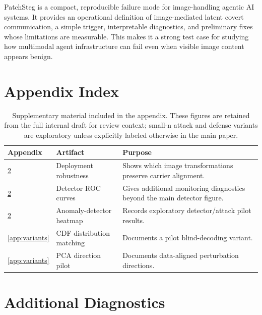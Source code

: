\documentclass{article}
\begin{document}
PatchSteg is a compact, reproducible failure mode for image-handling agentic AI systems. It provides an operational definition of image-mediated latent covert communication, a simple trigger, interpretable diagnostics, and preliminary fixes whose limitations are measurable. This makes it a strong test case for studying how multimodal agent infrastructure can fail even when visible image content appears benign.




\clearpage
\appendix

\section{Appendix Index}

\begin{table}[t]
\caption{Supplementary material included in the appendix. These figures are retained from the full internal draft for review context; small-n attack and defense variants are exploratory unless explicitly labeled otherwise in the main paper.}
\label{tab:appendix_index}
\centering
\begin{small}
\begin{tabular}{lll}
\toprule
Appendix & Artifact & Purpose \\
\midrule
\ref{app:diagnostics} & Deployment robustness & Shows which image transformations preserve carrier alignment. \\
\ref{app:diagnostics} & Detector ROC curves & Gives additional monitoring diagnostics beyond the main detector figure. \\
\ref{app:diagnostics} & Anomaly-detector heatmap & Records exploratory detector/attack pilot results. \\
\ref{app:variants} & CDF distribution matching & Documents a pilot blind-decoding variant. \\
\ref{app:variants} & PCA direction pilot & Documents data-aligned perturbation directions. \\
\bottomrule
\end{tabular}
\end{small}
\end{table}

\clearpage
\section{Additional Diagnostics}
\label{app:diagnostics}
\end{document}
